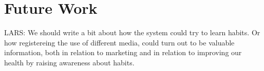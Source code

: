 \chapter{Future Work}
LARS: We should write a bit about how the system could try to learn habits. Or how registereing the use of different media, could turn out to be valuable information, both in relation to marketing and in relation to improving our health by raising awareness about habits.